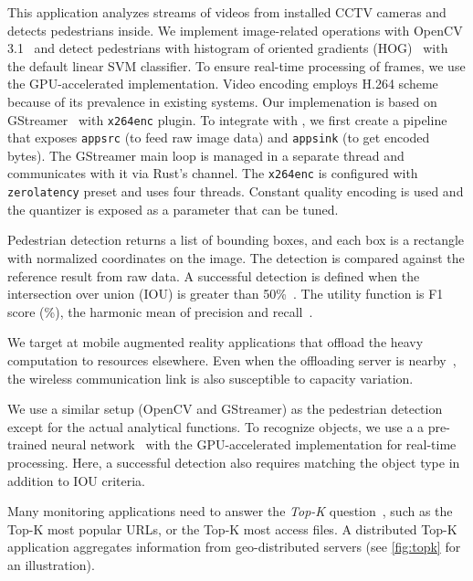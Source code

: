  This application analyzes streams of videos from
installed CCTV cameras and detects pedestrians inside. We implement
image-related operations with OpenCV 3.1~\cite{opencvlibrary} and detect
pedestrians with histogram of oriented gradients
(HOG)~\cite{dalal2005histograms} with the default linear SVM classifier. To
ensure real-time processing of frames, we use the GPU-accelerated
implementation. Video encoding employs H.264 scheme because of its prevalence in
existing systems. Our implemenation is based on GStreamer~\cite{gstreamer} with
\texttt{x264enc} plugin. To integrate with \sysname{}, we first create a
pipeline that exposes \texttt{appsrc} (to feed raw image data) and
\texttt{appsink} (to get encoded bytes). The GStreamer main loop is managed in a
separate thread and \sysname{} communicates with it via Rust's channel. The
\texttt{x264enc} is configured with \texttt{zerolatency} preset and uses four
threads. Constant quality encoding is used and the quantizer is exposed as a
parameter that can be tuned.

Pedestrian detection returns a list of bounding boxes, and each box is a
rectangle with normalized coordinates on the image. The detection is compared
against the reference result from raw data. A successful detection is defined
when the intersection over union (IOU) is greater than
50\%~\cite{everingham2010pascal}. The utility function is F1 score (\%), the
harmonic mean of precision and recall~\cite{Rijsbergen:1979:IR:539927}.

 We target at mobile augmented reality applications
that offload the heavy computation to resources elsewhere. Even when the
offloading server is nearby~\cite{satyanarayanan2009case, zhang2015cloud}, the
wireless communication link is also susceptible to capacity variation.

We use a similar setup (OpenCV and GStreamer) as the pedestrian detection except
for the actual analytical functions. To recognize objects, we use a a
pre-trained neural network~\cite{darknet13, redmon2016yolo9000} with the
GPU-accelerated implementation for real-time processing. Here, a successful
detection also requires matching the object type in addition to IOU criteria.

 Many monitoring applications need to answer the
\textit{Top-K} question~\cite{babcock2003distributed}, such as the Top-K most
popular URLs, or the Top-K most access files. A distributed Top-K application
aggregates information from geo-distributed servers (see \autoref{fig:topk} for
an illustration).

